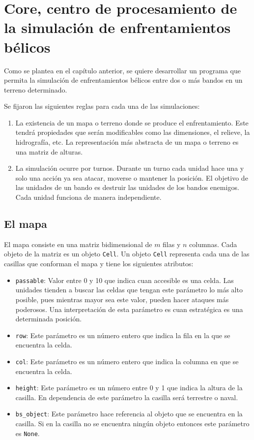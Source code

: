 \section{Core, centro de procesamiento de la simulación de enfrentamientos bélicos}

Como se plantea en el capítulo anterior, se quiere desarrollar un programa que permita la simulación de enfrentamientos bélicos entre dos o más bandos en un terreno determinado.

Se fijaron las siguientes reglas para cada una de las simulaciones:

\begin{enumerate}
	\item La existencia de un mapa o terreno donde se produce el enfrentamiento. Este tendrá propiedades que serán modificables como las dimensiones, el relieve, la hidrografía, etc. La representación más abstracta de un mapa o terreno es una matriz de alturas.
	
	\item La simulación ocurre por turnos. Durante un turno cada unidad hace una y solo una acción ya sea atacar, moverse o mantener la posición. El objetivo de las unidades de un bando es destruir las unidades de los bandos enemigos. Cada unidad funciona de manera independiente. 
\end{enumerate}

\subsection{El mapa}

El mapa consiste en una matriz bidimensional de $m$ filas y $n$ columnas. Cada objeto de la matriz es un objeto \verb|Cell|. Un objeto \verb|Cell| representa cada una de las casillas que conforman el mapa y tiene los siguientes atributos:

\begin{itemize}
	\item \verb|passable|: Valor entre 0 y 10 que indica cuan accesible es una celda. Las unidades tienden a buscar las celdas que tengan este parámetro lo más alto posible, pues mientras mayor sea este valor, pueden hacer ataques más poderosos. Una interpretaci\'on de esta par\'ametro es cuan estrat\'egica es una determinada posici\'on.
	\item \verb|row|: Este parámetro es un número entero que indica la fila en la que se encuentra la celda.
	\item \verb|col|: Este parámetro es un número entero que indica la columna en que se encuentra la celda.
	\item \verb|height|: Este parámetro es un número entre 0 y 1 que indica la altura de la casilla. En dependencia de este parámetro la casilla será terrestre o naval.
	\item \verb|bs_object|: Este parámetro hace referencia al objeto que se encuentra en la casilla. Si en la casilla no se encuentra ningún objeto entonces este parámetro es \verb|None|.
\end{itemize}

